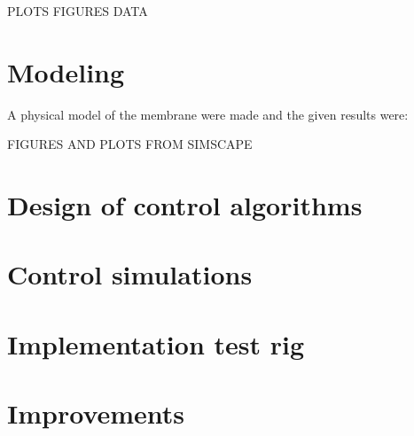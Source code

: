 PLOTS FIGURES DATA


\section{Modeling}
A physical model of the membrane were made and the given results were:


FIGURES AND PLOTS FROM SIMSCAPE

\section{Design of control algorithms}

\section{Control simulations}

\section{Implementation test rig}



\section{Improvements}
